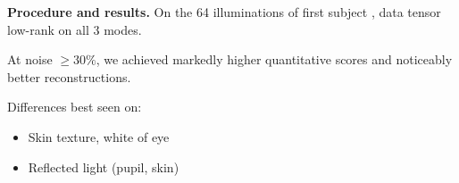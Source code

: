 \documentclass[landscape,a1paper,fontscale=0.42]{baposter}
\begin{document}
\begin{poster}
{{  }
  \vspace{-0.7em}
  \begin{multicols}{2}

    \textbf{Procedure and results.}
    On the 64 illuminations of first subject \cite{Bahri2017}, data tensor low-rank on all 3 modes.

    \vspace{1em}
    At noise $\geq 30\%$, we achieved markedly higher quantitative scores and noticeably better reconstructions.
    
    Differences best seen on:
    \begin{itemize}
      \item Skin texture, white of eye
      \item Reflected light (pupil, skin)
    \end{itemize}
  \end{multicols}
}

\end{poster}
\end{document}
